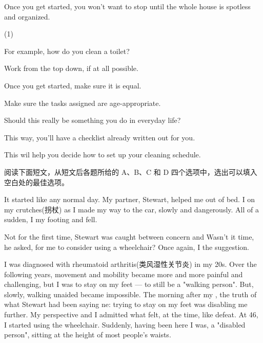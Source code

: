 \documentclass{英语试卷}
\begin{document}
\par Once you get started, you won't want to stop until the whole house is spotless and organized.\par
\begin{choices}(1)
  \item For example, how do you clean a toilet?
  \item Work from the top down, if at all possible.
  \item Once you get started, make sure it is equal.
  \item Make sure the tasks assigned are age-appropriate.
  \item Should this really be something you do in everyday life?
  \item This way, you'll have a checklist already written out for you.
  \item This wil help you decide how to set up your cleaning schedule.
\end{choices}
\par 阅读下面短文，从短文后各题所给的 A、B、C 和 D 四个选项中，选出可以填入空白处的最佳选项。\par
\par It started like any normal day. My partner, Stewart, helped me out of bed. I  on my crutches(拐杖) as I made my way to the car, slowly and dangerously. All of a sudden, I  my footing and fell.\par
\par Not for the first time, Stewart was caught between concern and  Wasn't it time, he asked, for me to consider using a wheelchair? Once again, I  the suggestion.\par
\par I was diagnosed with rheumatoid arthritis(类风湿性关节炎) in my 20s. Over the following years, movement and mobility became more and more painful and challenging, but I was  to stay on my feet — to still be a "walking person". But, slowly, walking unaided became impossible. The morning after my , the truth of what Stewart had been saying  ne: trying to stay on my feet was disabling me further. My perspective  and I admitted what felt, at the time, like defeat. At 46, I started using the wheelchair. Suddenly, having been  here I was, a "disabled person", sitting at the height of most people’s waists.\par
\end{document}

